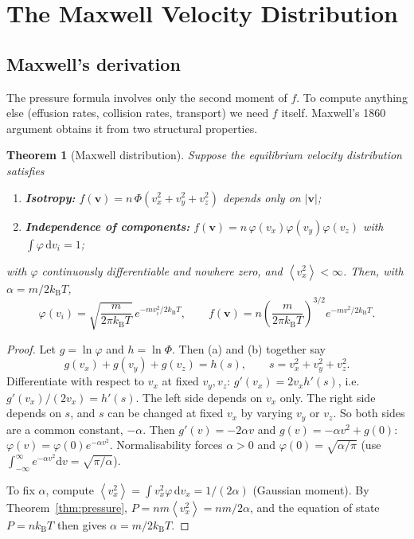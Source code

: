 \documentclass[11pt,a4paper]{report}
\theoremstyle{definition}
\theoremstyle{plain}
\newtheorem{theorem}[definition]{Theorem}
\newcommand{\kB}{k_{\mathrm{B}}}
\newcommand{\dd}{\mathrm{d}}
\newcommand{\avg}[1]{\left\langle #1\right\rangle}
\newcommand{\vv}{\mathbf{v}}
\begin{document}
\section{The Maxwell Velocity Distribution}
\label{sec:maxwell}

\subsection{Maxwell's derivation}

The pressure formula involves only the second moment of $f$. To compute anything else (effusion rates, collision rates, transport) we need $f$ itself. Maxwell's 1860 argument obtains it from two structural properties.

\begin{theorem}[Maxwell distribution]\label{thm:maxwell}
Suppose the equilibrium velocity distribution satisfies
\begin{enumerate}[label=(\alph*),nosep]
\item \textbf{Isotropy:} $f(\vv)=n\,\Phi(v_x^2+v_y^2+v_z^2)$ depends only on $|\vv|$;
\item \textbf{Independence of components:} $f(\vv)=n\,\varphi(v_x)\varphi(v_y)\varphi(v_z)$ with $\int\varphi\,\dd v_i=1$;
\end{enumerate}
with $\varphi$ continuously differentiable and nowhere zero, and $\avg{v_x^2}<\infty$. Then, with $\alpha=m/2\kB T$,
\begin{equation}
\varphi(v_i)=\sqrt{\frac{m}{2\pi\kB T}}\,e^{-mv_i^2/2\kB T},\qquad
f(\vv)=n\left(\frac{m}{2\pi\kB T}\right)^{3/2}e^{-mv^2/2\kB T}.
\label{eq:maxwell}
\end{equation}
\end{theorem}

\begin{proof}
Let $g=\ln\varphi$ and $h=\ln\Phi$. Then (a) and (b) together say
\begin{equation}
g(v_x)+g(v_y)+g(v_z)=h(s),\qquad s=v_x^2+v_y^2+v_z^2 .
\label{eq:funceq}
\end{equation}
Differentiate with respect to $v_x$ at fixed $v_y,v_z$: $g'(v_x)=2v_xh'(s)$, i.e.\ $g'(v_x)/(2v_x)=h'(s)$. The left side depends on $v_x$ only. The right side depends on $s$, and $s$ can be changed at fixed $v_x$ by varying $v_y$ or $v_z$. So both sides are a common constant, $-\alpha$. Then $g'(v)=-2\alpha v$ and $g(v)=-\alpha v^2+g(0)$: $\varphi(v)=\varphi(0)e^{-\alpha v^2}$. Normalisability forces $\alpha>0$ and $\varphi(0)=\sqrt{\alpha/\pi}$ (use $\int_{-\infty}^\infty e^{-\alpha v^2}\dd v=\sqrt{\pi/\alpha}$).

To fix $\alpha$, compute $\avg{v_x^2}=\int v_x^2\varphi\,\dd v_x=1/(2\alpha)$ (Gaussian moment). By Theorem~\ref{thm:pressure}, $P=nm\avg{v_x^2}=nm/2\alpha$, and the equation of state $P=n\kB T$ then gives $\alpha=m/2\kB T$.
\end{proof}
\end{document}
